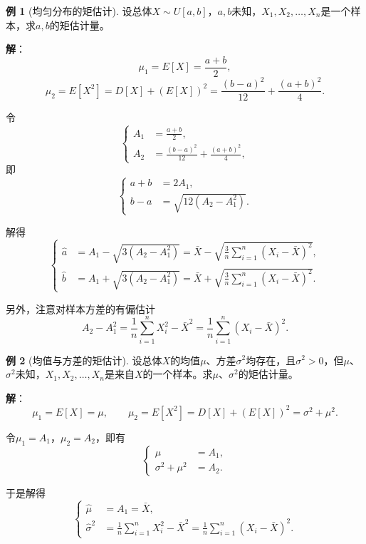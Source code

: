 \documentclass[11pt,a4paper]{report}
\theoremstyle{definition}
\newtheorem{example}{例}[chapter]
\begin{document}
\begin{example}[均匀分布的矩估计]
设总体$X\sim U[a,b]$，$a,b$未知，$X_{1},X_{2},\ldots,X_{n}$是一个样本，求$a,b$的矩估计量。

\textbf{解}：
\[
\mu_{1}=E[X]=\frac{a+b}{2},
\]
\[
\mu_{2}=E[X^{2}]=D[X]+(E[X])^{2}=\frac{(b-a)^{2}}{12}+\frac{(a+b)^{2}}{4}.
\]

令
\[
\left\{
\begin{aligned}
A_{1}&=\frac{a+b}{2},\\[0.3em]
A_{2}&=\frac{(b-a)^{2}}{12}+\frac{(a+b)^{2}}{4},
\end{aligned}
\right.
\]
即
\[
\left\{
\begin{aligned}
a+b&=2A_{1},\\
b-a&=\sqrt{12\left(A_{2}-A_{1}^{2}\right)}.
\end{aligned}
\right.
\]

解得
\[
\left\{
\begin{aligned}
\hat{a}&=A_{1}-\sqrt{3\left(A_{2}-A_{1}^{2}\right)}=\bar{X}-\sqrt{\frac{3}{n}\sum_{i=1}^{n}\left(X_{i}-\bar{X}\right)^{2}},\\[0.3em]
\hat{b}&=A_{1}+\sqrt{3\left(A_{2}-A_{1}^{2}\right)}=\bar{X}+\sqrt{\frac{3}{n}\sum_{i=1}^{n}\left(X_{i}-\bar{X}\right)^{2}}.
\end{aligned}
\right.
\]

另外，注意对样本方差的有偏估计
\[
A_{2}-A_{1}^{2}=\frac{1}{n}\sum_{i=1}^{n}X_{i}^{2}-\bar{X}^{2}=\frac{1}{n}\sum_{i=1}^{n}\left(X_{i}-\bar{X}\right)^{2}.
\]
\end{example}

\begin{example}[均值与方差的矩估计]
设总体$X$的均值$\mu$、方差$\sigma^{2}$均存在，且$\sigma^{2}>0$，但$\mu$、$\sigma^{2}$未知，$X_{1},X_{2},\ldots,X_{n}$是来自$X$的一个样本。求$\mu$、$\sigma^{2}$的矩估计量。

\textbf{解}：
\[
\mu_{1}=E[X]=\mu,\qquad \mu_{2}=E[X^{2}]=D[X]+(E[X])^{2}=\sigma^{2}+\mu^{2}.
\]

令$\mu_{1}=A_{1}$，$\mu_{2}=A_{2}$，即有
\[
\left\{
\begin{aligned}
\mu&=A_{1},\\
\sigma^{2}+\mu^{2}&=A_{2}.
\end{aligned}
\right.
\]

于是解得
\[
\left\{
\begin{aligned}
\hat{\mu}&=A_{1}=\bar{X},\\[0.3em]
\hat{\sigma}^{2}&=\frac{1}{n}\sum_{i=1}^{n}X_{i}^{2}-\bar{X}^{2}=\frac{1}{n}\sum_{i=1}^{n}\left(X_{i}-\bar{X}\right)^{2}.
\end{aligned}
\right.
\]
\end{example}
\end{document}
